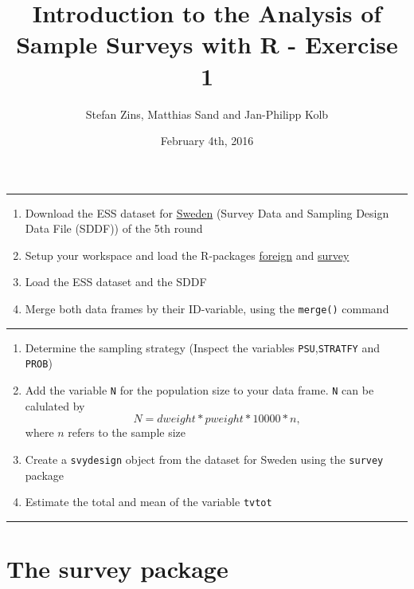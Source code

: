\documentclass[]{article}
\title{Introduction to the Analysis of Sample Surveys with R - Exercise 1}
\author{Stefan Zins, Matthias Sand and Jan-Philipp Kolb}
\date{February 4th, 2016}
\begin{document}
\maketitle


\begin{center}\rule{0.5\linewidth}{\linethickness}\end{center}

\begin{enumerate}
\def\labelenumi{\arabic{enumi}.}
\itemsep1pt\parskip0pt
\item
  Download the ESS dataset for
  \href{http://www.europeansocialsurvey.org/data/country.html?c=sweden}{Sweden}
  (Survey Data and Sampling Design Data File (SDDF)) of the 5th round
\item
  Setup your workspace and load the R-packages
  \href{https://cran.r-project.org/web/packages/foreign/foreign.pdf}{foreign}
  and
  \href{https://cran.r-project.org/web/packages/survey/index.html}{survey}
\item
  Load the ESS dataset and the SDDF
\item
  Merge both data frames by their ID-variable, using the
  \texttt{merge()} command
\end{enumerate}

\begin{center}\rule{0.5\linewidth}{\linethickness}\end{center}

\begin{enumerate}
\def\labelenumi{\arabic{enumi}.}
\setcounter{enumi}{4}
\itemsep1pt\parskip0pt
\item
  Determine the sampling strategy (Inspect the variables
  \texttt{PSU},\texttt{STRATFY} and \texttt{PROB})
\item
  Add the variable \texttt{N} for the population size to your data
  frame. \texttt{N} can be calulated by
  \[N= dweight* pweight *10000*n \text{,}\] where \(n\) refers to the
  sample size
\item
  Create a \texttt{svydesign} object from the dataset for Sweden using
  the \texttt{survey} package
\item
  Estimate the total and mean of the variable \texttt{tvtot}
\end{enumerate}

\begin{center}\rule{0.5\linewidth}{\linethickness}\end{center}

\section{The survey package}\label{the-survey-package}
\end{document}
